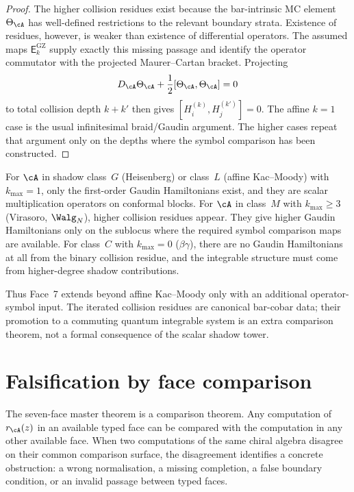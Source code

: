 \begin{proof}
The higher collision residues exist because the bar-intrinsic
MC element $\Theta_\cA$ has well-defined restrictions to the relevant
boundary strata. Existence of residues, however, is weaker than
existence of differential operators. The assumed maps
$\mathsf E^{\mathrm{GZ}}_k$ supply exactly this missing passage and
identify the operator commutator with the projected
Maurer--Cartan bracket. Projecting
\[
  D_\cA \Theta_\cA + \frac{1}{2}[\Theta_\cA, \Theta_\cA] = 0
\]
to total collision depth $k+k'$ then gives
$[H_i^{(k)},H_j^{(k')}]=0$. The affine $k=1$ case is the usual
infinitesimal braid/Gaudin argument. The higher cases repeat that
argument only on the depths where the symbol comparison has been
constructed.
\end{proof}

\begin{remark}
\label{rem:hdm-higher-gaudin-trichotomy}
For $\cA$ in shadow class~$G$ (Heisenberg) or class~$L$ (affine
Kac--Moody) with $k_{\max} = 1$, only the first-order Gaudin
Hamiltonians exist, and they are scalar multiplication operators on
conformal blocks. For $\cA$ in class~$M$ with $k_{\max} \geq 3$
(Virasoro, $\Walg_N$), higher collision residues appear. They give
higher Gaudin Hamiltonians only on the sublocus where the required
symbol comparison maps are available. For class~$C$ with $k_{\max} = 0$
($\beta\gamma$), there are no Gaudin Hamiltonians at all from the
binary collision residue, and the integrable structure must come
from higher-degree shadow contributions.
\end{remark}

Thus Face~7 extends beyond affine Kac--Moody only with an additional
operator-symbol input. The iterated collision residues are canonical
bar-cobar data; their promotion to a commuting quantum integrable
system is an extra comparison theorem, not a formal consequence of the
scalar shadow tower.

\section{Falsification by face comparison}
\label{sec:hdm-falsification}

The seven-face master theorem is a comparison theorem. Any
computation of $r_\cA(z)$ in an available typed face can be compared with
the computation in any other available face. When two computations
of the same chiral algebra disagree on their common comparison
surface, the disagreement identifies a concrete obstruction: a wrong
normalisation, a missing completion, a false boundary condition, or
an invalid passage between typed faces.

